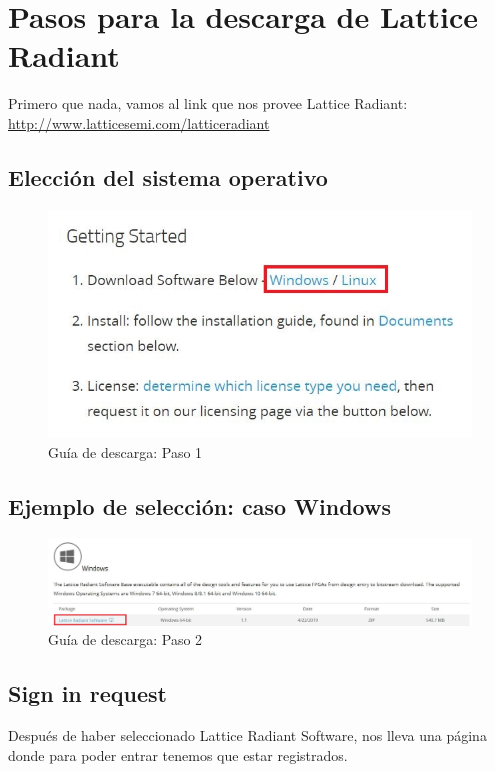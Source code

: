 \documentclass{article}
\begin{document}
\newgeometry{} %



\tableofcontents
\newpage



\section{Pasos para la descarga de Lattice Radiant}
Primero que nada, vamos al link que nos provee Lattice Radiant:
\href{http://www.latticesemi.com/latticeradiant}{http://www.latticesemi.com/latticeradiant}

\subsection{ Elección del sistema operativo}

\begin{figure}[H]
\centering
\includegraphics[width=0.4\linewidth]{images/1.JPG}
\caption{Guía de descarga: Paso 1}
\label{fig:step1}
\end{figure}


\subsection{ Ejemplo de selección: caso Windows}

\begin{figure}[H]
\centering
\includegraphics[width=1\linewidth]{images/2.JPG}
\caption{Guía de descarga: Paso 2}
\label{fig:step2}
\end{figure}

\subsection{Sign in request}
Después de haber seleccionado Lattice Radiant Software, nos lleva una página donde para poder entrar tenemos que estar registrados.
\end{document}
